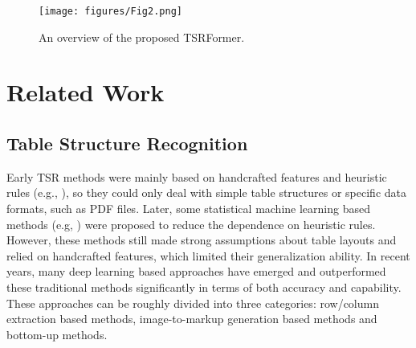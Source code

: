\documentclass[sigconf]{acmart}
\begin{document}
\begin{figure*}
    \centering
    \texttt{[image: figures/Fig2.png]}
    \caption{An overview of the proposed TSRFormer.}
    \label{fig-2}
\end{figure*}


\section{Related Work}
\subsection{Table Structure Recognition}
Early TSR methods were mainly based on handcrafted features and heuristic rules (e.g., \cite{laurentini1992identifying,itonori1993table,trecs1998,shigarov2016configurable,rastan2019texus}), so they could only deal with simple table structures or specific data formats, such as PDF files. Later, some statistical machine learning based methods (e.g, \cite{ng1999learning,wang2004table}) were proposed to reduce the dependence on heuristic rules. However, these methods still made strong assumptions about table layouts and relied on handcrafted features, which limited their generalization ability. In recent years, many deep learning based approaches have emerged and outperformed these traditional methods significantly in terms of both accuracy and capability. These approaches can be roughly divided into three categories: row/column extraction based methods, image-to-markup generation based methods and bottom-up methods.
\end{document}
